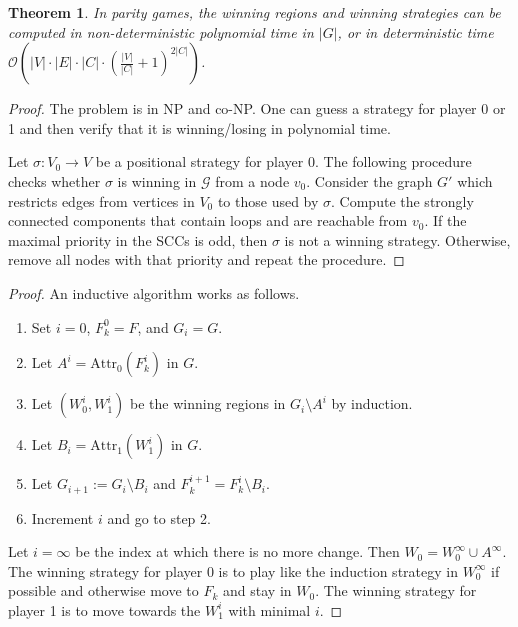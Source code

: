 \documentclass{article}
\newtheorem{theorem}{Theorem}
\begin{document}
\vspace{0.5cm}
\begin{theorem}
	 In parity games, the winning regions and winning strategies can be computed in non-deterministic polynomial time in $|G|$, or in deterministic time $\mathcal{O}\left(|V| \cdot |E| \cdot |C| \cdot (\frac{|V|}{|C|} + 1)^{2|C|}\right)$.
\end{theorem}
\begin{proof}
	The problem is in NP and co-NP. One can guess a strategy for player 0 or 1 and then verify that it is winning/losing in polynomial time.
	
	Let $\sigma : V_0 \rightarrow V$ be a positional strategy for player 0. The following procedure checks whether $\sigma$ is winning in $\mathcal{G}$ from a node $v_0$. Consider the graph $G'$ which restricts edges from vertices in $V_0$ to those used by $\sigma$. Compute the strongly connected components that contain loops and are reachable from $v_0$. If the maximal priority in the SCCs is odd, then $\sigma$ is not a winning strategy. Otherwise, remove all nodes with that priority and repeat the procedure.
\end{proof}
\begin{proof}
	An inductive algorithm works as follows. 
	\begin{enumerate}
		\item Set $i = 0$, $F^0_k = F$, and $G_i = G$.
		\item Let $A^i = \text{Attr}_0(F^i_k)$ in $G$.
		\item Let $(W^i_0, W^i_1)$ be the winning regions in $G_i \setminus A^i$ by induction.
		\item Let $B_i = \text{Attr}_1(W^i_1)$ in $G$.
		\item Let $G_{i+1} := G_i \setminus B_i$ and $F^{i+1}_k = F^i_k \setminus B_i$.
		\item Increment $i$ and go to step 2.
	\end{enumerate}
	Let $i = \infty$ be the index at which there is no more change. Then $W_0 = W^\infty_0 \cup A^\infty$. The winning strategy for player 0 is to play like the induction strategy in $W^\infty_0$ if possible and otherwise move to $F_k$ and stay in $W_0$. The winning strategy for player 1 is to move towards the $W^i_1$ with minimal $i$.
\end{proof}
\end{document}
